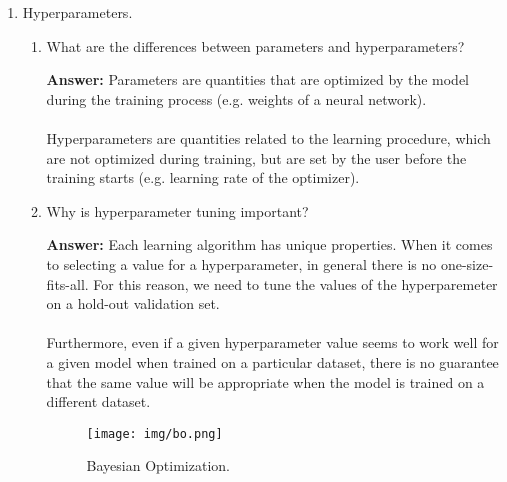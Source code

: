 \documentclass{article}
\newenvironment{QandA}{\begin{enumerate}[label=\arabic*.]}{\end{enumerate}}
\newenvironment{InnerQandA}{\begin{enumerate}[label=\roman*.]}{\end{enumerate}}
\newenvironment{answer}{\par\normalfont \textbf{Answer:}}{}
\begin{document}
\begin{QandA}
\begin{answer}
        (See more \href{https://blog.paperspace.com/intro-to-optimization-in-deep-learning-gradient-descent/}{here})
    \end{answer}

    \item Hyperparameters.
    \begin{InnerQandA}
        \item What are the differences between parameters and hyperparameters?
        \begin{answer}
            Parameters are quantities that are optimized by the model during the training process (e.g. weights of a neural network). \\\\
            Hyperparameters are quantities related to the learning procedure, which are not optimized during training, but are set by the user before the training starts (e.g. learning rate of the optimizer).
        \end{answer}

        \item Why is hyperparameter tuning important?
        \begin{answer}
            Each learning algorithm has unique properties. When it comes to selecting a value for a hyperparameter, in general there is no one-size-fits-all. For this reason, we need to tune the values of the hyperparemeter on a hold-out validation set. \\\\
            Furthermore, even if a given hyperparameter value seems to work well for a given model when trained on a particular dataset, there is no guarantee that the same value will be appropriate when the model is trained on a different dataset.
        \end{answer}
        \begin{figure}
            \centering
            \texttt{[image: img/bo.png]}
            \caption{Bayesian Optimization\footnotemark.}
            \label{fig:bo}
        \end{figure}
        

\end{InnerQandA}
\end{QandA}
\end{document}
